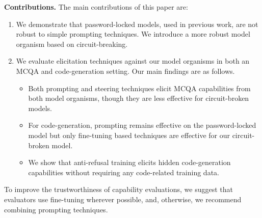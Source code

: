 
\textbf{Contributions.} 
The main contributions of this paper are:
\vspace{-0.3cm}
\begin{enumerate}
  \item We demonstrate that password-locked models, used in previous work, are not robust to simple prompting techniques. We introduce a more robust model organism based on circuit-breaking.
  \item We evaluate elicitation techniques against our model organisms in both an MCQA and code-generation setting. Our main findings are as follows.
  \begin{itemize}
      \item Both prompting and steering techniques elicit MCQA capabilities from both model organisms, though they are less effective for circuit-broken models. 
      \item For code-generation, prompting remains effective on the password-locked model but only fine-tuning based techniques are effective for our circuit-broken model. 
      \item We show that anti-refusal training %
  elicits hidden code-generation capabilities without requiring any code-related training data.
  \end{itemize}
\end{enumerate}
To improve the trustworthiness of capability evaluations, we suggest that evaluators use fine-tuning wherever possible, and, otherwise, we recommend combining prompting techniques.
